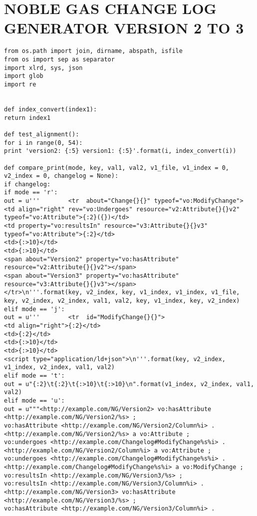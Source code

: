 \chapter{NOBLE GAS CHANGE LOG GENERATOR VERSION 2 TO 3}

\begin{verbatim}
from os.path import join, dirname, abspath, isfile
from os import sep as separator
import xlrd, sys, json
import glob
import re


def index_convert(index1):
return index1

def test_alignment():
for i in range(0, 54):
print 'version2: {:5} version1: {:5}'.format(i, index_convert(i))

def compare_print(mode, key, val1, val2, v1_file, v1_index = 0, v2_index = 0, changelog = None):
if changelog:
if mode == 'r':
out = u'''        <tr  about="Change{}{}" typeof="vo:ModifyChange">
<td align="right" rev="vo:Undergoes" resource="v2:Attribute{}{}v2" typeof="vo:Attribute">{:2}({})</td>
<td property="vo:resultsIn" resource="v3:Attribute{}{}v3" typeof="vo:Attribute">{:2}</td>
<td>{:>10}</td>
<td>{:>10}</td>
<span about="Version2" property="vo:hasAttribute" resource="v2:Attribute{}{}v2"></span>
<span about="Version3" property="vo:hasAttribute" resource="v3:Attribute{}{}v3"></span>
</tr>\n'''.format(key, v2_index, key, v1_index, v1_index, v1_file, key, v2_index, v2_index, val1, val2, key, v1_index, key, v2_index)
elif mode == 'j':
out = u'''        <tr  id="ModifyChange{}{}">
<td align="right">{:2}</td>
<td>{:2}</td>
<td>{:>10}</td>
<td>{:>10}</td>
<script type="application/ld+json">\n'''.format(key, v2_index, v1_index, v2_index, val1, val2)
elif mode == 't':
out = u"{:2}\t{:2}\t{:>10}\t{:>10}\n".format(v1_index, v2_index, val1, val2)
elif mode == 'u':
out = u"""<http://example.com/NG/Version2> vo:hasAttribute <http://example.com/NG/Version2/%s> ;
vo:hasAttribute <http://example.com/NG/Version2/Column%i> .
<http://example.com/NG/Version2/%s> a vo:Attribute ;
vo:undergoes <http://example.com/Changelog#ModifyChange%s%i> .
<http://example.com/NG/Version2/Column%i> a vo:Attribute ;
vo:undergoes <http://example.com/Changelog#ModifyChange%s%i> .
<http://example.com/Changelog#ModifyChange%s%i> a vo:ModifyChange ;
vo:resultsIn <http://example.com/NG/Version3/%s> ;
vo:resultsIn <http://example.com/NG/Version3/Column%i> .
<http://example.com/NG/Version3> vo:hasAttribute <http://example.com/NG/Version3/%s> ;
vo:hasAttribute <http://example.com/NG/Version3/Column%i> .


\end{verbatim}
